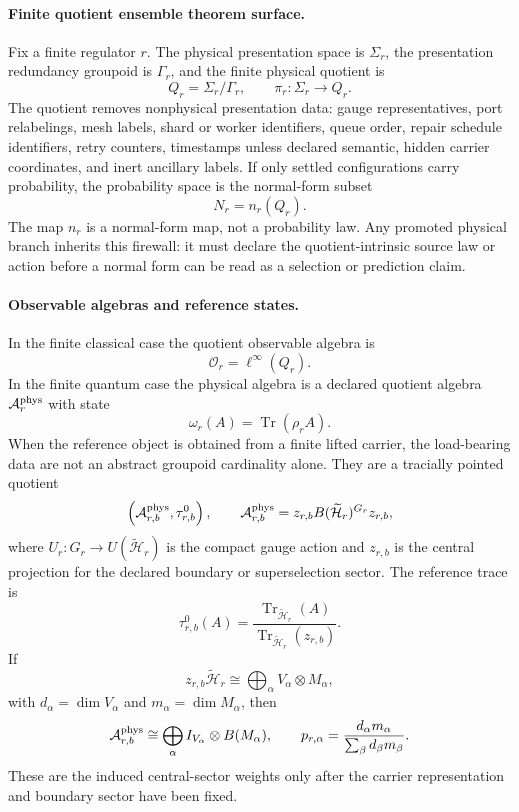 \paragraph{Finite quotient ensemble theorem surface.}
Fix a finite regulator \(r\).  The physical presentation space is \(\Sigma_r\), the
presentation redundancy groupoid is \(\Gamma_r\), and the finite physical quotient is
\[
Q_r=\Sigma_r/\Gamma_r,\qquad \pi_r:\Sigma_r\to Q_r.
\]
The quotient removes nonphysical presentation data: gauge representatives, port relabelings, mesh
labels, shard or worker identifiers, queue order, repair schedule identifiers, retry counters,
timestamps unless declared semantic, hidden carrier coordinates, and inert ancillary labels.  If
only settled configurations carry probability, the probability space is the normal-form subset
\[
N_r=n_r(Q_r).
\]
The map \(n_r\) is a normal-form map, not a probability law. Any promoted physical branch inherits
this firewall: it must declare the quotient-intrinsic source law or action before a normal form can
be read as a selection or prediction claim.

\paragraph{Observable algebras and reference states.}
In the finite classical case the quotient observable algebra is
\[
\mathcal O_r=\ell^\infty(Q_r).
\]
In the finite quantum case the physical algebra is a declared quotient algebra
\(\mathcal A^{\rm phys}_r\) with state
\[
\omega_r(A)=\operatorname{Tr}(\rho_r A).
\]
When the reference object is obtained from a finite lifted carrier, the load-bearing data are not
an abstract groupoid cardinality alone.  They are a tracially pointed quotient
\[
\left(\mathcal A^{\rm phys}_{r,b},\tau^0_{r,b}\right),
\qquad
\mathcal A^{\rm phys}_{r,b}
=
z_{r,b}B(\widetilde{\mathcal H}_r)^{G_r}z_{r,b},
\]
where \(U_r:G_r\to U(\widetilde{\mathcal H}_r)\) is the compact gauge action and \(z_{r,b}\) is
the central projection for the declared boundary or superselection sector.  The reference trace is
\[
\tau^0_{r,b}(A)
=
\frac{\operatorname{Tr}_{\widetilde{\mathcal H}_r}(A)}
{\operatorname{Tr}_{\widetilde{\mathcal H}_r}(z_{r,b})}.
\]
If
\[
z_{r,b}\widetilde{\mathcal H}_r
\cong
\bigoplus_\alpha V_\alpha\otimes M_\alpha,
\]
with \(d_\alpha=\dim V_\alpha\) and \(m_\alpha=\dim M_\alpha\), then
\[
\mathcal A^{\rm phys}_{r,b}
\cong
\bigoplus_\alpha I_{V_\alpha}\otimes B(M_\alpha),
\qquad
p_{r,\alpha}
=
\frac{d_\alpha m_\alpha}{\sum_\beta d_\beta m_\beta}.
\]
These are the induced central-sector weights only after the carrier representation and boundary
sector have been fixed.


